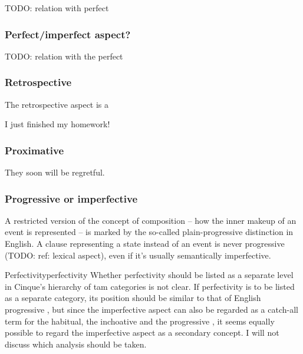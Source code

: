 \documentclass[UTF8, a4paper, oneside, scheme=plain, 12pt]{ctexbook}
\newcommand*{\citesec}[1]{\S~{#1}}
\newcommand*{\citepage}[1]{p.~{#1}}
\begin{document}
TODO: relation with perfect 

\subsubsection{Perfect/imperfect aspect?}

TODO: relation with the perfect

\subsubsection{Retrospective}

The retrospective aspect is a 
\begin{exe}
    \ex I just finished my homework!
\end{exe}

\subsubsection{Proximative}

\begin{exe}
    \ex They soon will be regretful.
\end{exe}

\subsubsection{Progressive or imperfective}

A restricted version of the concept of composition 
-- how the inner makeup of an event is represented \citep[\citesec{19.10}]{dixon2012basic3} -- 
is marked by the so-called plain-progressive distinction in English.
A clause representing a state instead of an event 
is never progressive (TODO: ref: lexical aspect),
even if it's usually semantically imperfective.


\begin{infobox}{Perfectivity}{perfectivity}
    Whether perfectivity should be listed as a separate level 
    in Cinque's hierarchy of \acs{tam} categories is not clear. 
    If perfectivity is to be listed as a separate category,
    its position should be similar to that of English progressive \citep{pearce2015completing},
    but since the imperfective aspect 
    can also be regarded as a catch-all term 
    for the habitual, the inchoative and the progressive \citep[\citepage{255}]{van2011tense},
    it seems equally possible to regard the imperfective aspect 
    as a secondary concept. 
    I will not discuss which analysis should be taken.
\end{infobox}
\end{document}
